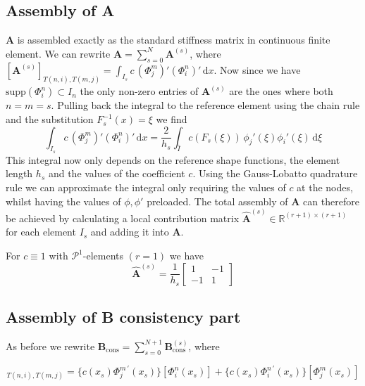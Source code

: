 \subsection{Assembly of A}
$\textbf{A}$ is assembled exactly as the standard stiffness matrix in continuous finite element.
We can rewrite $\textbf{A} = \sum_{s=0}^{N} \textbf{A}^{(s)}$, where 
$[\textbf{A}^{(s)}]_{T(n,i),T(m,j)} = \int_{I_s} c \,(\Phi_j^m)' (\Phi_i^n)' \, \text{d}x$.
Now since we have $\text{supp}(\Phi_i^n)\subset I_n$ the only non-zero entries of $\textbf{A}^{(s)} $ are the ones where both $n=m=s$. Pulling back the integral 
to the reference element using the chain rule and the substitution $F_s^{-1}(x) = \xi$ we find
\begin{equation*}
    \int_{I_s} c \,(\Phi_j^m)' (\Phi_i^n)' \, \text{d}x = 
    \frac{2}{h_s} \int_{\hat{I}} c(F_s(\xi)) \, \phi_j'(\xi) \phi_i'(\xi) \, \text{d}\xi
\end{equation*}
This integral now only depends on the reference shape functions, the element length $h_s$
and the values of the coefficient $c$. Using the Gauss-Lobatto quadrature rule we can approximate the integral
only requiring the values of $c$ at the nodes, whilst having the values of $\phi, \phi'$ preloaded.
The total assembly of $\textbf{A}$ can therefore be achieved by calculating a local contribution matrix 
$\widehat{\textbf{A}}^{(s)} \in \mathbb{R}^{(r+1)\times (r+1)}$ for each element $I_s$ and adding it into $\textbf{A}$. 
\begin{example}
    For $c\equiv 1$ with $\mathcal{P}^1$-elements $(r=1)$ we have 
\begin{equation*}
    \widehat{\textbf{A}}^{(s)} = \frac{1}{h_s}
    \begin{bmatrix}
         1  & -1 \\
        -1  &  1 
    \end{bmatrix}
\end{equation*}
\end{example}

\subsection{Assembly of B consistency part}
As before we rewrite $\textbf{B}_{\text{cons}} = \sum_{s=0}^{N+1} \textbf{B}_{\text{cons}}^{(s)} $, where 

\begin{equation*}
    [\textbf{B}_{\text{cons}}^{(s)}]_{T(n,i),T(m,j)} = \{c(x_s) \Phi_j^{m \, \prime} (x_s)\}[\Phi_i^n(x_s)] + \{c(x_s)\Phi_i^{n\, \prime} (x_s)\}[\Phi_j^m(x_s)]
\end{equation*}

